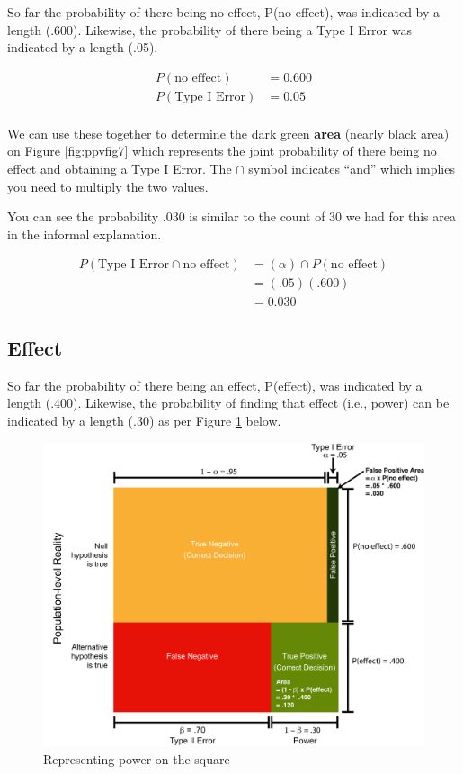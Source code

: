 \documentclass[
]{krantz}
\begin{document}
So far the probability of there being no effect, P(no effect), was indicated by a length (.600). Likewise, the probability of there being a Type I Error was indicated by a length (.05).

\[
\begin{aligned}
P(\text{no effect}) &= 0.600 \\
P(\text{Type I Error}) &= 0.05 \\
\end{aligned}
\]

We can use these together to determine the dark green \textbf{area} (nearly black area) on Figure \ref{fig:ppvfig7} which represents the joint probability of there being no effect and obtaining a Type I Error. The \(\cap\) symbol indicates ``and'' which implies you need to multiply the two values.

You can see the probability .030 is similar to the count of 30 we had for this area in the informal explanation.

\[
\begin{aligned}
P(\text{Type I Error} \cap \text{no effect} ) &= (\alpha) \cap P(\text{no effect}) \\
&= (.05)(.600) \\
&= 0.030
\end{aligned}
\]

\hypertarget{effect}{%
\subsection{Effect}\label{effect}}

So far the probability of there being an effect, P(effect), was indicated by a length (.400). Likewise, the probability of finding that effect (i.e., power) can be indicated by a length (.30) as per Figure \ref{fig:ppvfig8} below.

\begin{figure}
\includegraphics[width=0.9\linewidth]{ch_ppv/images/fig8} \caption{Representing power on the square}\label{fig:ppvfig8}
\end{figure}
\end{document}
